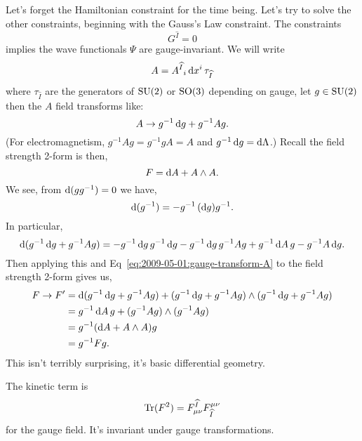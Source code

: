 Let's forget the Hamiltonian constraint for the time being. Let's try to
solve the other constraints, beginning with the Gauss's Law constraint.
The constraints
\begin{equation}
G^{\widehat{I}} = 0
\end{equation}
implies the wave functionals $\Psi$ are gauge-invariant. We will write
\begin{equation}
A = {A^{\widehat{I}}}_{i}\,\mathrm{d} x^{i}\,\tau_{\widehat{I}}
\end{equation}
where $\tau_{\widehat{I}}$ are the generators of $\operatorname{SU}(2)$ or $\operatorname{SO}(3)$
depending on gauge, let $g\in\operatorname{SU}(2)$ then the $A$ field transforms like:
\begin{equation}\label{eq:2009-05-01:gauge-transform-A}
A\to g^{-1}\,\mathrm{d} g + g^{-1}Ag.
\end{equation}
(For electromagnetism, $g^{-1}Ag = g^{-1}gA=A$ and $g^{-1}\,\mathrm{d} g =\mathrm{d}\Lambda$.)
Recall the field strength 2-form is then,
\begin{equation}
F = \mathrm{d} A + A\wedge A.
\end{equation}
We see, from $\mathrm{d}(gg^{-1})=0$ we have,
\begin{equation}
\mathrm{d}(g^{-1}) = -g^{-1}\,(\mathrm{d} g) g^{-1}.
\end{equation}
In particular,
\begin{equation}
\mathrm{d}(g^{-1}\,\mathrm{d} g + g^{-1}Ag) = - g^{-1}\,\mathrm{d} g\, g^{-1}\,\mathrm{d} g - g^{-1}\,\mathrm{d} g\,g^{-1}Ag +
g^{-1}\,\mathrm{d} A\,g - g^{-1}A\,\mathrm{d} g.
\end{equation}
Then applying this and Eq~\eqref{eq:2009-05-01:gauge-transform-A} to the field
strength 2-form gives us,
\begin{subequations}
\begin{align}
F\to F' &= \mathrm{d}(g^{-1}\,\mathrm{d} g + g^{-1}Ag) + (g^{-1}\,\mathrm{d} g + g^{-1}A g)\wedge(g^{-1}\,\mathrm{d} g + g^{-1}A g)\\
&= g^{-1}\,\mathrm{d} A\, g + (g^{-1}Ag)\wedge(g^{-1}Ag)\\
&= g^{-1}(\mathrm{d} A + A\wedge A)g\\
&= g^{-1}Fg.
\end{align}
\end{subequations}
This isn't terribly surprising, it's basic differential geometry.

The kinetic term is
\begin{equation}
\operatorname{Tr}(F^{2}) = F^{\widehat{I}}_{\mu\nu}F^{\mu\nu}_{\widehat{I}}
\end{equation}
for the gauge field. It's invariant under gauge transformations.

